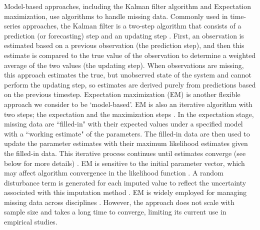 Model-based approaches, including the Kalman filter algorithm and Expectation maximization, use algorithms to handle missing data. Commonly used in time-series approaches, the Kalman filter is a two-step algorithm that consists of a prediction (or forecasting) step and an updating step \citep{kalman_filter_1960}. First, an observation is estimated based on a previous observation (the prediction step), and then this estimate is compared to the true value of the observation to determine a weighted average of the two values (the updating step). When observations are missing, this approach estimates the true, but unobserved state of the system and cannot perform the updating step, so estimates are derived purely from predictions based on the previous timestep. Expectation maximization (EM) is another flexible approach we consider to be `model-based'. EM is also an iterative algorithm with two steps; the expectation and the maximization steps \citep{nadjafi2022expectation,li2019expectation}. In the expectation stage, missing data are ``filled-in" with their expected values under a specified model with a ``working estimate" of the parameters. The filled-in data are then used to update the parameter estimates with their maximum likelihood estimates given the filled-in data. This iterative process continues until estimates converge (see below for more details) \citep{kang2013prevention}. EM is sensitive to the initial parameter vector, which may affect algorithm convergence in the likelihood function \citep{sammaknejad2019review, dempster1977maximum}. A random disturbance term is generated for each imputed value to reflect the uncertainty associated with this imputation method \citep{kang2013prevention}. EM is widely employed for managing missing data across disciplines \citep{nadjafi2022expectation, vamanu2019altered, sammaknejad2019review}. However, the approach does not scale with sample size and takes a long time to converge, limiting its current use in empirical studies. 

